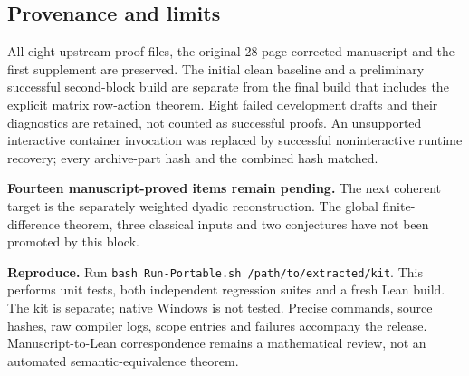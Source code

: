 \documentclass[11pt]{article}
\begin{document}
\subsection*{Provenance and limits}
All eight upstream proof files, the original 28-page corrected manuscript and the first supplement are preserved. The initial clean baseline and a preliminary successful second-block build are separate from the final build that includes the explicit matrix row-action theorem. Eight failed development drafts and their diagnostics are retained, not counted as successful proofs. An unsupported interactive container invocation was replaced by successful noninteractive runtime recovery; every archive-part hash and the combined hash matched.

\textbf{Fourteen manuscript-proved items remain pending.} The next coherent target is the separately weighted dyadic reconstruction. The global finite-difference theorem, three classical inputs and two conjectures have not been promoted by this block.

\textbf{Reproduce.} Run \texttt{bash Run-Portable.sh /path/to/extracted/kit}. This performs unit tests, both independent regression suites and a fresh Lean build. The kit is separate; native Windows is not tested. Precise commands, source hashes, raw compiler logs, scope entries and failures accompany the release. Manuscript-to-Lean correspondence remains a mathematical review, not an automated semantic-equivalence theorem.
\end{document}
